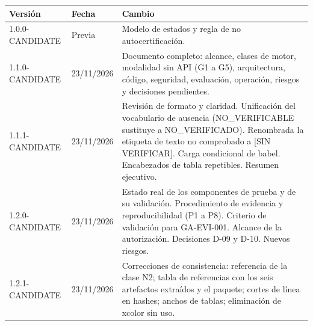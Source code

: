 \documentclass[12pt]{article}
\begin{document}
\begin{longtable}{|p{3cm}|p{2.6cm}|p{8.6cm}|}
\hline
\textbf{Versión} & \textbf{Fecha} & \textbf{Cambio} \\
\hline
\endhead
1.0.0-CANDIDATE & Previa & Modelo de estados y regla de no autocertificación. \\
\hline
1.1.0-CANDIDATE & 23/11/2026 & Documento completo: alcance, clases de motor, modalidad sin API (G1 a G5), arquitectura, código, seguridad, evaluación, operación, riesgos y decisiones pendientes. \\
\hline
1.1.1-CANDIDATE & 23/11/2026 & Revisión de formato y claridad. Unificación del vocabulario de ausencia (NO\_VERIFICABLE sustituye a NO\_VERIFICADO). Renombrada la etiqueta de texto no comprobado a [SIN VERIFICAR]. Carga condicional de babel. Encabezados de tabla repetibles. Resumen ejecutivo. \\
\hline
1.2.0-CANDIDATE & 23/11/2026 & Estado real de los componentes de prueba y de su validación. Procedimiento de evidencia y reproducibilidad (P1 a P8). Criterio de validación para GA-EVI-001. Alcance de la autorización. Decisiones D-09 y D-10. Nuevos riesgos. \\
\hline
1.2.1-CANDIDATE & 23/11/2026 & Correcciones de consistencia: referencia de la clase N2; tabla de referencias con los seis artefactos extraídos y el paquete; cortes de línea en hashes; anchos de tablas; eliminación de xcolor sin uso. \\
\hline
\end{longtable}
\end{document}
